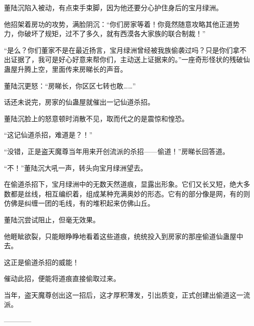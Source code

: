 \begin{this_body}
董陆沉陷入被动，有点束手束脚，因为他还要分心护住身后的宝月绿洲。

他招架着房功的攻势，满脸阴沉：“你们房家等着！你竟然随意攻略其他正道势力，你破坏了规矩，过不了多久，就有西漠各大家族的联合制裁！”

“是么？你们董家不是在最近扬言，宝月绿洲曾经被我族偷袭过吗？只是你们拿不出证据了，我可是好心好意来帮你们，主动送上证据来的。”一座奇形怪状的残破仙蛊屋升腾上空，里面传来房睇长的声音。

董陆沉更怒：“房睇长，你区区七转也敢……”

话还未说完，房家的仙蛊屋就催出一记仙道杀招。

董陆沉脸上的怒意顿时消散不见，取而代之的是震惊和惶恐。

“这记仙道杀招，难道是？！”

“没错，正是盗天魔尊当年用来开创流派的杀招——偷道！”房睇长回答道。

“不！”董陆沉大吼一声，转头向宝月绿洲望去。

在偷道杀招下，宝月绿洲中的无数天然道痕，显露出形象。它们又长又短，绝大多数都是丝线，相互编织着，组成某种充满奥妙的形态。它有的部分像是网，有的则仿佛是纠缠一团的毛线，有的堆积起来仿佛山丘。

董陆沉尝试阻止，但毫无效果。

他睚眦欲裂，只能眼睁睁地看着这些道痕，统统投入到房家的那座偷道仙蛊屋中去。

这正是偷道杀招的威能！

催动此招，便能将道痕直接偷取过来。

当年，盗天魔尊创出这一招后，这才厚积薄发，引出质变，正式创建出偷道这一流派。

------------

\end{this_body}

